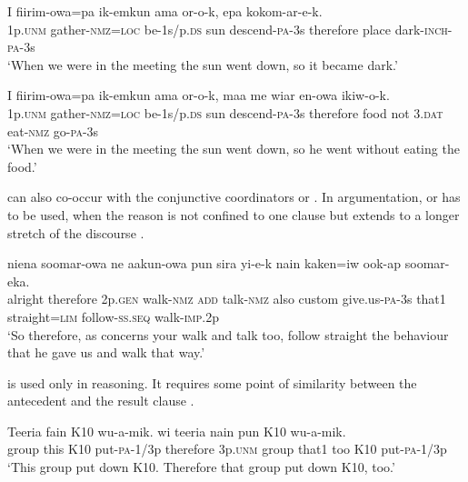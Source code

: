 \ea%
\label{ex:3:x1414}
\gll I fiirim-owa=pa ik-emkun ama or-o-k,  epa kokom-ar-e-k.\\
1p.\textsc{unm} gather-\textsc{nmz}=\textsc{loc} be-1s/p.\textsc{ds} sun descend-\textsc{pa}-3s therefore place dark-\textsc{inch}-\textsc{pa}-3s\\
\glt`When we were in the meeting the sun went down, so it became dark.'
\z

\ea%
\label{ex:3:x1415}
\gll I fiirim-owa=pa ik-emkun ama or-o-k,  maa me wiar en-owa ikiw-o-k.\\
1p.\textsc{unm} gather-\textsc{nmz}=\textsc{loc} be-1s/p.\textsc{ds} sun descend-\textsc{pa}-3s therefore food not 3.\textsc{dat} eat-\textsc{nmz} go-\textsc{pa}-3s\\
\glt`When we were in the meeting the sun went down, so he went without eating the food.'
\z

 can also co-occur with the conjunctive coordinators  or . In argumentation,  or  has to be used, when the reason is not confined to one clause but extends to a longer stretch of the discourse .

\ea%
\label{ex:3:x1406}
\gll {}  niena soomar-owa ne aakun-owa pun sira yi-e-k nain kaken=iw ook-ap soomar-eka.\\
alright therefore 2p.\textsc{gen} walk-\textsc{nmz} \textsc{add} talk-\textsc{nmz} also custom give.us-\textsc{pa}-3s that1 straight=\textsc{lim} follow-\textsc{ss}.\textsc{seq} walk-\textsc{imp}.2p\\
\glt`So therefore, as concerns your walk and talk too, follow straight the behaviour that he gave us and walk that way.'
\z

 is used only in reasoning. It requires some point of similarity between the antecedent and the result clause .

\ea%
\label{ex:3:x736}
\gll Teeria fain K10 wu-a-mik.  wi teeria nain pun K10 wu-a-mik.\\
group this K10 put-\textsc{pa}-1/3p therefore 3p.\textsc{unm} group that1 too K10 put-\textsc{pa}-1/3p\\
\glt`This group put down K10. Therefore that group put down K10, too.'
\z


